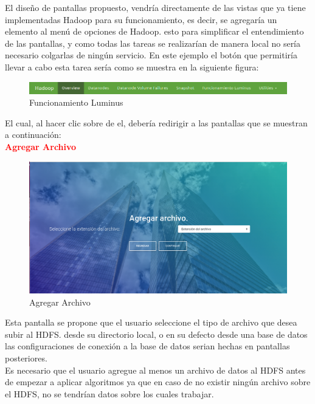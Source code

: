 El diseño de pantallas propuesto, vendría directamente de las vistas que ya tiene implementadas Hadoop para su funcionamiento, es decir, se agregaría un elemento al menú de opciones de Hadoop. esto para simplificar el entendimiento de las pantallas, y como todas las tareas se realizarían de manera local no sería necesario colgarlas de ningún servicio. En este ejemplo el botón que permitiría llevar a cabo esta tarea sería  como se muestra en la siguiente figura:\\
\begin{figure}[H]
	\hypertarget{fig:red}{\hspace{1pt}}
	\begin{center}
		\includegraphics[width=.9\textwidth]{capitulo7/images/menu.png}
		\caption{Funcionamiento Luminus}
		\label{fig:agre}
	\end{center}
\end{figure}
El cual, al hacer clic sobre de el, debería redirigir a las pantallas que se muestran a continuación:
\\
\textbf{\textcolor{red}{Agregar Archivo}}
\begin{figure}[H]
	\hypertarget{fig:red}{\hspace{1pt}}
	\begin{center}
		\includegraphics[width=.9\textwidth]{capitulo7/images/AgregarArchivo.png}
		\caption{Agregar Archivo}
		\label{fig:agre}
	\end{center}
\end{figure}
Esta pantalla se propone que el usuario seleccione el tipo de archivo que desea subir al HDFS. desde su directorio local, o en su defecto desde una base de datos las configuraciones de conexión a la base de datos serian hechas en pantallas posteriores.\\
Es necesario que el usuario agregue al menos un archivo de datos al HDFS antes de empezar a aplicar algoritmos ya que en caso de no existir ningún archivo sobre el HDFS, no se tendrían datos sobre los cuales trabajar.\\
